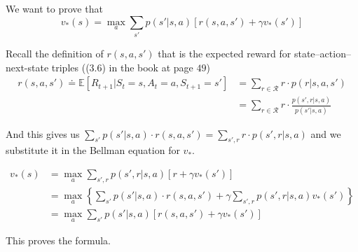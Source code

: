 \documentclass[10pt,a4paper]{article}
\begin{document}
We want to prove that 
\begin{equation}
v_*(s) = \max_{a} \sum_{s'} p(s' \lvert s, a) \left[r(s, a, s') + \gamma v_*(s')\right]
\end{equation}

Recall the definition of $r(s, a, s')$ that is the expected reward for state--action--next-state triples (($3.6$) in the book at page $49$)
\begin{equation}
\begin{split}
r(s, a, s') \doteq \mathbb{E}[R_{t+1} \lvert S_t = s, A_t = a, S_{t+1} = s'] &= \sum_{r \in \mathcal{R}} r \cdot p(r \lvert s, a, s')\\
&= \sum_{r \in \mathcal{R}} r \cdot \frac{p(s', r \lvert s, a)}{p(s' \lvert s, a)}
\end{split}
\end{equation}

And this gives us $\sum_{s'} p(s' \lvert s, a) \cdot r(s, a, s') = \sum_{s', r} r \cdot p(s', r \lvert s, a)$ and we substitute it in the Bellman equation for $v_*$.

\begin{equation}
\begin{split}
v_*(s) &= \max_{a} \sum_{s', r} p(s', r \lvert s, a) \left[r + \gamma v_*(s')\right]\\
&=\max_{a}\left\{\sum_{s'} p(s' \lvert s, a) \cdot r(s, a, s') + \gamma \sum_{s', r} p(s', r \lvert s, a) v_*(s')\right\}\\
&= \max_{a} \sum_{s'} p(s' \lvert s, a) \left[r(s, a, s') + \gamma v_*(s')\right]
\end{split}
\end{equation}

This proves the formula.
\end{document}
